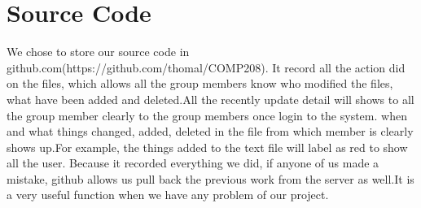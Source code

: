\section{Source Code}

We chose to store our source code in github.com(https://github.com/thomal/COMP208).
It record all the action did on the files, which allows all the group members know 
who modified the files, what have been added and deleted.All the recently update 
detail will shows to all the group member clearly to the group members once login 
to the system. when and what things changed, added, deleted in the file from which 
member is clearly shows up.For example, the things added to the text file will 
label as red to show all the user. Because it recorded everything we did, if 
anyone of us made a mistake, github allows us pull back the previous work from the 
server as well.It is a very useful function when we have any problem of our project.